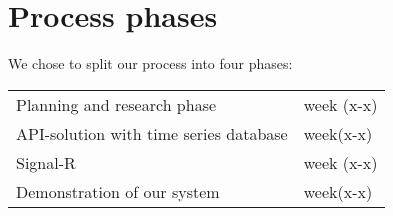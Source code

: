 \section{Process phases}

We chose to split our process into four phases:

\begin{tabular}{l l}
Planning and research phase & week (x-x) \\

API-solution with time series database & week(x-x) \\

Signal-R & week (x-x) \\
Demonstration of our system & week(x-x) 
\end{tabular}